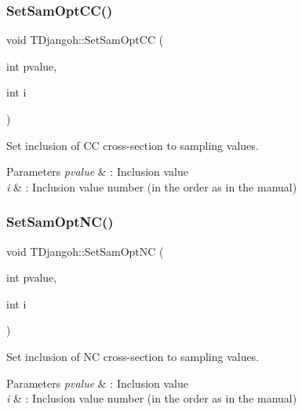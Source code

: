 \mbox{\label{class_t_djangoh_acc7a3124293fe30c297fb7702bade781}} 
\subsubsection{\texorpdfstring{Set\+Sam\+Opt\+C\+C()}{SetSamOptCC()}}
{\footnotesize\ttfamily void T\+Djangoh\+::\+Set\+Sam\+Opt\+CC (\begin{DoxyParamCaption}\item[{int}]{pvalue,  }\item[{int}]{i }\end{DoxyParamCaption})}



Set inclusion of CC cross-\/section to sampling values. 


\begin{DoxyParams}{Parameters}
{\em pvalue} & \+: Inclusion value \\
\hline
{\em i} & \+: Inclusion value number (in the order as in the manual) \\
\hline
\end{DoxyParams}
\mbox{\label{class_t_djangoh_a6e6fa7e1826bd4e86be44d80a6bd6854}} 
\subsubsection{\texorpdfstring{Set\+Sam\+Opt\+N\+C()}{SetSamOptNC()}}
{\footnotesize\ttfamily void T\+Djangoh\+::\+Set\+Sam\+Opt\+NC (\begin{DoxyParamCaption}\item[{int}]{pvalue,  }\item[{int}]{i }\end{DoxyParamCaption})}



Set inclusion of NC cross-\/section to sampling values. 


\begin{DoxyParams}{Parameters}
{\em pvalue} & \+: Inclusion value \\
\hline
{\em i} & \+: Inclusion value number (in the order as in the manual) \\
\hline
\end{DoxyParams}
\mbox{\label{class_t_djangoh_a12bd5515ab5db50b147810e06e98a0b8}} 
